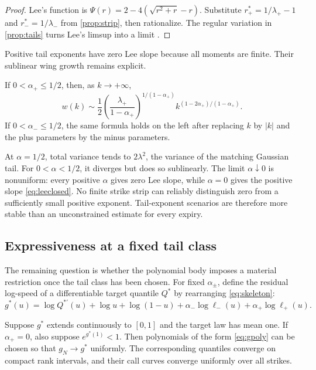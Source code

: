 \begin{proof}
Lee's function is
$\Psi(r)=2-4(\sqrt{r^2+r}-r)$.  Substitute
$r_+^*=1/\lambda_+-1$ and $r_-^*=1/\lambda_-$ from
\cref{prop:strip}, then rationalize.  The regular variation in
\cref{prop:tails} turns Lee's limsup into a limit
\citep{BenaimFriz2009}.
\end{proof}

Positive tail exponents have zero Lee slope because all moments are finite.
Their sublinear wing growth remains explicit.

\begin{proposition}
\label{prop:sublinearwings}
If $0<\alpha_+\le1/2$, then, as $k\to+\infty$,
\begin{equation}
w(k)\sim
\frac12\left(\frac{\lambda_+}{1-\alpha_+}
\right)^{1/(1-\alpha_+)}
k^{(1-2\alpha_+)/(1-\alpha_+)}.
\label{eq:rightsublinearwing}
\end{equation}
If $0<\alpha_-\le1/2$, the same formula holds on the left after replacing
$k$ by $|k|$ and the plus parameters by the minus parameters.
\end{proposition}

At $\alpha=1/2$, total variance tends to $2\lambda^2$, the variance of the
matching Gaussian tail.  For $0<\alpha<1/2$, it diverges but does so
sublinearly.  The limit $\alpha\downarrow0$ is nonuniform: every positive
$\alpha$ gives zero Lee slope, while $\alpha=0$ gives the positive slope
\eqref{eq:leeclosed}.  No finite strike strip can reliably distinguish zero
from a sufficiently small positive exponent.  Tail-exponent scenarios are
therefore more stable than an unconstrained estimate for every expiry.

\subsection{Expressiveness at a fixed tail class}

The remaining question is whether the polynomial body imposes a material
restriction once the tail class has been chosen.  For fixed $\alpha_\pm$,
define the residual log-speed of a differentiable target quantile $Q^*$ by
rearranging \eqref{eq:skeleton}:
\begin{equation}
g^*(u)=\log Q^{*\prime}(u)+\log u+\log(1-u)
+\alpha_-\log\ell_-(u)+\alpha_+\log\ell_+(u).
\label{eq:targetg}
\end{equation}

\begin{proposition}
\label{prop:universal}
Suppose $g^*$ extends continuously to $[0,1]$ and the target law has mean one.
If $\alpha_+=0$, also suppose $e^{g^*(1)}<1$.  Then polynomials of the form
\eqref{eq:gpoly} can be chosen so that $g_N\to g^*$ uniformly.  The
corresponding quantiles converge on compact rank intervals, and their call
curves converge uniformly over all strikes.
\end{proposition}

